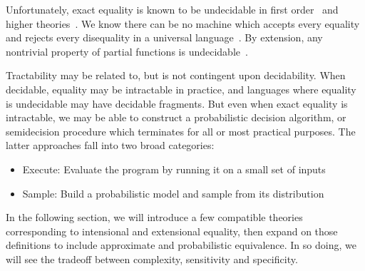 \documentclass[11pt]{article}
\begin{document}
    Unfortunately, exact equality is known to be undecidable in first order~\cite{godel1929vollstandigkeit} and higher theories~\cite{godel1931formal}. We know there can be no machine which accepts every equality and rejects every disequality in a universal language~\cite{turing1937computable}. By extension, any nontrivial property of partial functions is undecidable~\cite{rice1953classes}. %


    Tractability may be related to, but is not contingent upon decidability. When decidable, equality may be intractable in practice, and languages where equality is undecidable may have decidable fragments. But even when exact equality is intractable, we may be able to construct a probabilistic decision algorithm, or semidecision procedure which terminates for all or most practical purposes. The latter approaches fall into two broad categories:

    \begin{itemize}
        \item Execute: Evaluate the program by running it on a small set of inputs
        \item Sample: Build a probabilistic model and sample from its distribution
    \end{itemize}

    In the following section, we will introduce a few compatible theories corresponding to intensional and extensional equality, then expand on those definitions to include approximate and probabilistic equivalence. In so doing, we will see the tradeoff between complexity, sensitivity and specificity.

%


\end{document}
